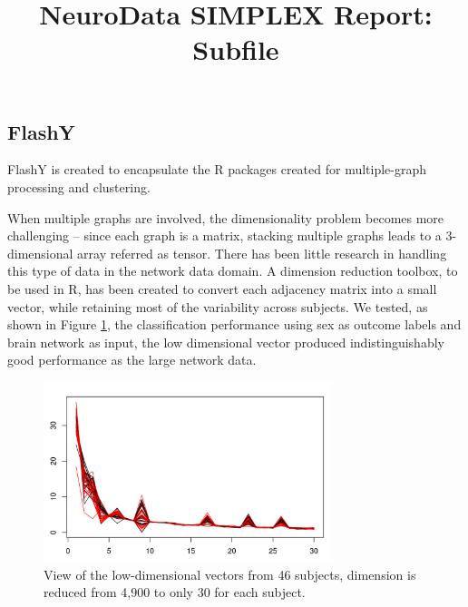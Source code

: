 \documentclass[simplex.tex]{subfiles}
\title{NeuroData SIMPLEX Report: Subfile}
\begin{document}

\subsection{FlashY}

FlashY is created to encapsulate the R packages created for
multiple-graph processing and clustering. 


When multiple graphs are involved, the dimensionality problem becomes
more challenging -- since each graph is a matrix, stacking multiple
graphs leads to a 3-dimensional array referred as tensor. There has been
little research in handling this type of data in the network data
domain. A dimension reduction toolbox, to be used in R, has been created
to convert each adjacency matrix into a small vector, while retaining
most of the variability across subjects. We tested, as shown in Figure
\ref{fig:flashy}, the classification performance using sex as outcome
labels and brain network as input, the low dimensional vector produced
indistinguishably good performance as the large network data.


\begin{figure}[h!]
\begin{cframed}
\centering
\includegraphics[width=0.75\textwidth]{./figs/flashY.png}
\caption{
View of the low-dimensional vectors from 46 subjects, dimension is
reduced from 4,900 to only 30 for each subject.
}
\label{fig:flashy}
\end{cframed}
\end{figure}
\end{document}

